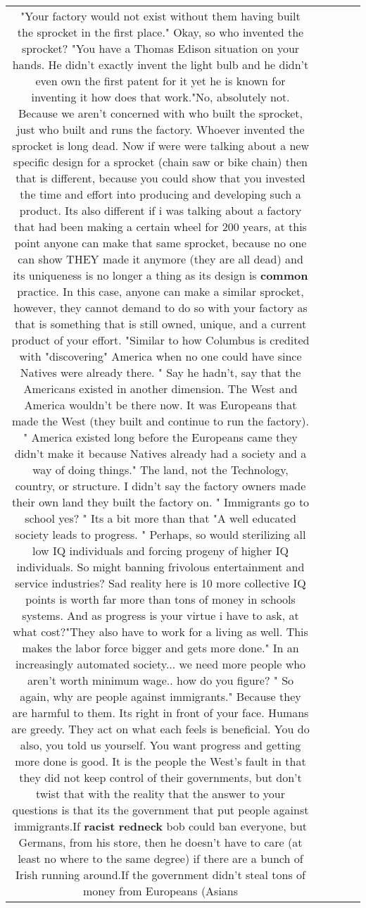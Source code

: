 \documentclass[11pt]{article}
\newlength\mylength
\begin{document}
\begin{center}
\begin{longtable}{|C{.65\mylength}|C{.30\mylength}|C{.12\mylength}|C{.12\mylength}|C{.12\mylength}|}
  \small "Your factory would not exist without them having built the sprocket in the first place." Okay, so who invented the sprocket? "You have a Thomas Edison situation on your hands. He didn't exactly invent the light bulb and he didn't even own the first patent for it yet he is known for inventing it how does that work."No, absolutely not. Because we aren't concerned with who built the sprocket, just who built and runs the factory. Whoever invented the sprocket is long dead. Now if were were talking about a new specific design for a sprocket (chain saw or bike chain) then that is different, because you could show that you invested the time and effort into producing and developing such a product. Its also different if i was talking about a factory that had been making a certain wheel for 200 years, at this point anyone can make that same sprocket, because no one can show THEY made it anymore (they are all dead) and its uniqueness is no longer a thing as its design is \textbf{common} practice. In this case, anyone can make a similar sprocket, however, they cannot demand to do so with your factory as that is something that is still owned, unique, and a current product of your effort.  "Similar to how Columbus is credited with "discovering" America when no one could have since Natives were already there. " Say he hadn't, say that the Americans existed in another dimension. The West and America wouldn't be there now. It was Europeans that made the West (they built and continue to run the factory). " America existed long before the Europeans came they didn't make it because Natives already had a society and a way of doing things." The land, not the Technology, country, or structure. I didn't say the factory owners made their own land they built the factory on. " Immigrants go to school yes? " Its a bit more than that "A well educated society leads to progress. " Perhaps, so would sterilizing all low IQ individuals and forcing progeny of higher IQ individuals. So might banning frivolous entertainment and service industries?  Sad reality here is 10 more collective IQ points is worth far more than tons of money in schools systems. And as progress is your virtue i have to ask, at what cost?"They also have to work for a living as well. This makes the labor force bigger and gets more done." In an increasingly automated society... we need more people who aren't worth minimum wage.. how do you figure? " So again, why are people against immigrants." Because they are harmful to them. Its right in front of your face. Humans are greedy. They act on what each feels is beneficial. You do also, you told us yourself.  You want progress and getting more done is good. It is the people the West's fault in that they did not keep control of their governments, but don't twist that with the reality that the answer to your questions is that its the government that put people against immigrants.If \textbf{racist} \textbf{r\textbf{edneck}} bob could ban everyone, but Germans, from his store, then he doesn't have to care (at least no where to the same degree) if there are a bunch of Irish running around.If the government didn't steal tons of money from Europeans (Asians 
\end{longtable}
\end{center}
\end{document}
